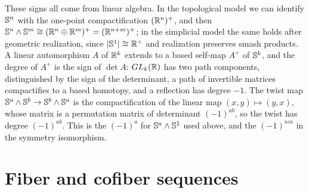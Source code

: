 These signs all come from linear algebra. In the topological model we can identify \(\S^n\) with the one-point compactification \((\R^n)^+\), and then \(\S^n \wedge \S^m \cong (\R^n \oplus \R^m)^+ = (\R^{n+m})^+\); in the simplicial model the same holds after geometric realization, since \(|\S^1| \cong \R^+\) and realization preserves smash products. A linear automorphism \(A\) of \(\R^k\) extends to a based self-map \(A^+\) of \(\S^k\), and the degree of \(A^+\) is the sign of \(\det A\): \(GL_k(\R)\) has two path components, distinguished by the sign of the determinant, a path of invertible matrices compactifies to a based homotopy, and a reflection has degree \(-1\). The twist map \(\S^a \wedge \S^b \to \S^b \wedge \S^a\) is the compactification of the linear map \((x, y) \mapsto (y, x)\), whose matrix is a permutation matrix of determinant \((-1)^{ab}\), so the twist has degree \((-1)^{ab}\). This is the \((-1)^a\) for \(\S^a \wedge \S^1\) used above, and the \((-1)^{nm}\) in the symmetry isomorphism.

\section{Fiber and cofiber sequences}

